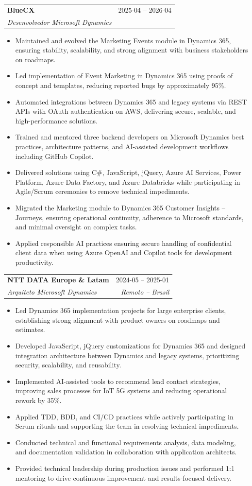 \documentclass[a4paper,11pt]{article}
\makeatletter
\newcommand{\resumeItem}[1]{
  \item\small{
    {#1 \vspace{-2pt}}
  }
}
\newcommand{\resumeSubheading}[4]{
  \vspace{-1pt}\item
  \begin{tabular*}{0.97\textwidth}{l@{\extracolsep{\fill}}r}
    \textbf{#1} & #2 \\
    \textit{\small#3} & \textit{\small #4} \\
  \end{tabular*}\vspace{-5pt}
}
\newcommand{\resumeItemListStart}{\begin{itemize}}
\newcommand{\resumeItemListEnd}{\end{itemize}\vspace{-5pt}}
\makeatother
\begin{document}
\resumeSubheading
{BlueCX}{2025-04 – 2026-04}
{Desenvolvedor Microsoft Dynamics}{}
\resumeItemListStart
\resumeItem{Maintained and evolved the Marketing Events module in Dynamics 365, ensuring stability, scalability, and strong alignment with business stakeholders on roadmaps.}
\resumeItem{Led implementation of Event Marketing in Dynamics 365 using proofs of concept and templates, reducing reported bugs by approximately 95\%.}
\resumeItem{Automated integrations between Dynamics 365 and legacy systems via REST APIs with OAuth authentication on AWS, delivering secure, scalable, and high-performance solutions.}
\resumeItem{Trained and mentored three backend developers on Microsoft Dynamics best practices, architecture patterns, and AI-assisted development workflows including GitHub Copilot.}
\resumeItem{Delivered solutions using C\#, JavaScript, jQuery, Azure AI Services, Power Platform, Azure Data Factory, and Azure Databricks while participating in Agile/Scrum ceremonies to remove technical impediments.}
\resumeItem{Migrated the Marketing module to Dynamics 365 Customer Insights – Journeys, ensuring operational continuity, adherence to Microsoft standards, and minimal oversight on complex tasks.}
\resumeItem{Applied responsible AI practices ensuring secure handling of confidential client data when using Azure OpenAI and Copilot tools for development productivity.}
\resumeItemListEnd

\resumeSubheading
{NTT DATA Europe \& Latam}{2024-05 – 2025-01}
{Arquiteto Microsoft Dynamics}{Remoto – Brasil}
\resumeItemListStart
\resumeItem{Led Dynamics 365 implementation projects for large enterprise clients, establishing strong alignment with product owners on roadmaps and estimates.}
\resumeItem{Developed JavaScript, jQuery customizations for Dynamics 365 and designed integration architecture between Dynamics and legacy systems, prioritizing security, scalability, and reusability.}
\resumeItem{Implemented AI-assisted tools to recommend lead contact strategies, improving sales processes for IoT 5G systems and reducing operational rework by 35\%.}
\resumeItem{Applied TDD, BDD, and CI/CD practices while actively participating in Scrum rituals and supporting the team in resolving technical impediments.}
\resumeItem{Conducted technical and functional requirements analysis, data modeling, and documentation validation in collaboration with application architects.}
\resumeItem{Provided technical leadership during production issues and performed 1:1 mentoring to drive continuous improvement and results-focused delivery.}
\resumeItemListEnd
\end{document}

